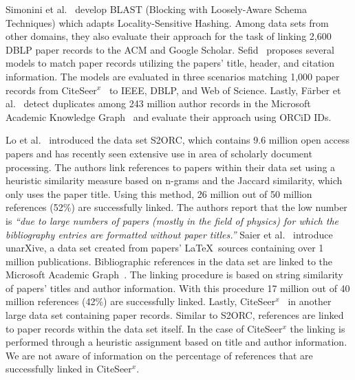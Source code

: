Simonini et al.~\cite{Simonini2016blast} develop BLAST (Blocking with Loosely-Aware Schema Techniques) which adapts Locality-Sensitive Hashing. Among data sets from other domains, they also evaluate their approach for the task of linking 2,600 DBLP paper records to the ACM and Google Scholar. 
Sefid~\cite{Sefid2019} proposes several models to match paper records utilizing the papers' title, header, and citation information. The models are evaluated in three scenarios matching 1,000 paper records from CiteSeer$^x$~\cite{CiteSeerX2019} to IEEE, DBLP, and Web of Science.
Lastly, Färber et al.~\cite{FaerberLin2022} detect duplicates among 243 million author records in the Microsoft Academic Knowledge Graph~\cite{MAKG} and evaluate their approach using ORCiD IDs.

%
Lo et al.~\cite{Lo2020} introduced the data set S2ORC, which contains 9.6 million open access papers and has recently seen extensive use in area of scholarly document processing. The authors link references to papers within their data set using a heuristic similarity measure based on n-grams and the Jaccard similarity, which only uses the paper title. Using this method, 26 million out of 50 million references  (52\%) are successfully linked. The authors report that the low number is \textit{``due to large numbers of papers (mostly in the field of physics) for which the bibliography entries are formatted without paper titles.''} Saier et al.~\cite{Saier2020} introduce unarXive, a data set created from papers' \LaTeX\ sources containing over 1 million publications. Bibliographic references in the data set are linked to the Microsoft Academic Graph~\cite{Sinha2015,Wang2019}. The linking procedure is based on string similarity of papers' titles and author information. With this procedure 17 million out of 40 million references (42\%) are successfully linked.
Lastly, CiteSeer$^x$~\cite{CiteSeerX2015,CiteSeerX2019} in another large data set containing paper records. Similar to S2ORC, references are linked to paper records within the data set itself. In the case of CiteSeer$^x$ the linking is performed through a heuristic assignment based on title and author information.  We are not aware of information on the percentage of references that are successfully linked in CiteSeer$^x$.

